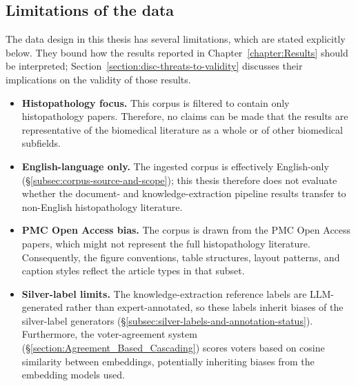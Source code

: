 \subsection{Limitations of the data}\label{subsec:corpus-limitations-of-data}

The data design in this thesis has several limitations, which are stated explicitly below. They bound how the results reported in Chapter~\ref{chapter:Results} should be interpreted; Section~\ref{section:disc-threats-to-validity} discusses their implications on the validity of those results.

\begin{itemize}[label={},leftmargin=1.5em]
    \item \textbf{Histopathology focus.} This corpus is filtered to contain only histopathology papers. Therefore, no claims can be made that the results are representative of the biomedical literature as a whole or of other biomedical subfields.
    
    \item \textbf{English-language only.} The ingested corpus is effectively English-only (§\ref{subsec:corpus-source-and-scope}); this thesis therefore does not evaluate whether the document- and knowledge-extraction pipeline results transfer to non-English histopathology literature.
    
    \item \textbf{PMC Open Access bias.} The corpus is drawn from the PMC Open Access papers, which might not represent the full histopathology literature. Consequently, the figure conventions, table structures, layout patterns, and caption styles reflect the article types in that subset. 
    
    \item \textbf{Silver-label limits.} The knowledge-extraction reference labels are LLM-generated rather than expert-annotated, so these labels inherit biases of the silver-label generators (§\ref{subsec:silver-labels-and-annotation-status}). Furthermore, the voter-agreement system (§\ref{section:Agreement_Based_Cascading}) scores voters based on cosine similarity between embeddings, potentially inheriting biases from the embedding models used.
    
\end{itemize}